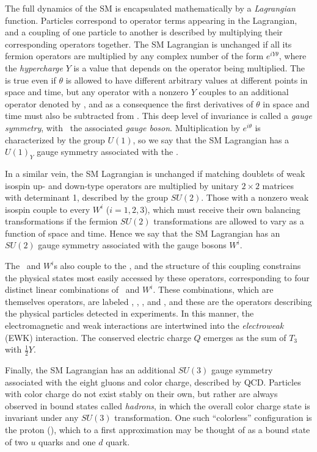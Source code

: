 \documentclass[oneside, letterpaper, 12pt, oldfontcommands]{memoir}
\begin{document}
The full dynamics of the SM is encapsulated mathematically by a \textit{Lagrangian} function. Particles correspond to operator
terms appearing in the Lagrangian, and a coupling of one particle to another is described by multiplying their
corresponding operators together. The SM Lagrangian is unchanged
if all its fermion operators are multiplied by any complex number of the form $e^{iY\theta}$, where the \textit{hypercharge} $Y$ is a value that depends
on the operator being multiplied. The is true even if $\theta$ is allowed to have different arbitrary values at
different points in space and time, but any operator with a nonzero $Y$ couples to an additional operator denoted by \PB,
and as a consequence the first derivatives of $\theta$ in space and time must also be subtracted from \PB.
This deep level of invariance is called a \textit{gauge symmetry}, with \PB\ the associated \textit{gauge boson}.
Multiplication by $e^{i\theta}$ is characterized by the group $U(1)$, so we say that the SM Lagrangian has a
$U(1)_{Y}$ gauge symmetry associated with the \PB.

In a similar vein, the SM Lagrangian is unchanged if matching doublets
of weak isospin up- and down-type operators are multiplied by unitary $2\times2$ matrices with determinant 1, described by the
group $SU(2)$. Those with a nonzero weak isospin couple to every $W^{i}$ ($i=1,2,3$), which must receive their own balancing transformations
if the fermion $SU(2)$ transformations are allowed to vary as a function of space and time.
Hence we say that the SM Lagrangian has an $SU(2)$ gauge symmetry associated with the gauge bosons $W^{i}$.

The \PB\ and $W^{i}$s also couple to the \PH, and the structure of this coupling constrains the physical states
most easily accessed by these operators, corresponding to four distinct linear combinations of
\PB\ and $W^{i}$. These combinations, which are themselves operators, are labeled \PZ, \Pgamma, \PWplus, and \PWminus,
and these are the operators describing the physical particles detected in experiments.
In this manner, the electromagnetic and weak interactions are intertwined into the \textit{electroweak} (EWK) interaction.
The conserved electric charge $Q$ emerges as the sum of $T_{3}$ with $\frac{1}{2}Y$.

Finally, the SM Lagrangian has an additional $SU(3)$ gauge symmetry associated with the eight gluons and color charge, described by QCD.
Particles with color charge do not exist stably on their own, but rather are always observed in bound states called \textit{hadrons}, in which the overall color
charge state is invariant under any $SU(3)$ transformation. One such ``colorless'' configuration is the proton (\Pp), which
to a first approximation may be thought of as a bound state of two $u$ quarks and one $d$ quark.
\end{document}
